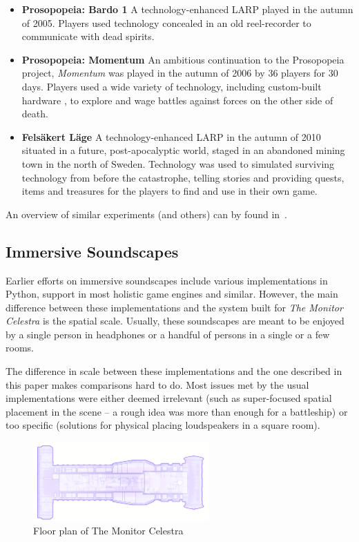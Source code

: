 \begin{itemize}
\item \textbf{Prosopopeia: Bardo 1} A technology-enhanced LARP played in the autumn of 2005. Players used technology concealed in an old reel-recorder to communicate with dead spirits.
\item \textbf{Prosopopeia: Momentum} An ambitious continuation to the Prosopopeia project, \emph{Momentum} was played in the autumn of 2006 by 36 players for 30 days.  Players used a wide variety of technology, including custom-built hardware , to explore and wage battles against forces on the other side of death. 
\item \textbf{Felsäkert Läge} A technology-enhanced LARP in the autumn of 2010 situated in a future, post-apocalyptic world, staged in an abandoned mining town in the north of Sweden. Technology was used to simulated surviving technology from before the catastrophe, telling stories and providing quests, items and treasures for the players to find and use in their own game.
\end{itemize}

An overview of similar experiments (and others) can by found in~\cite{nordiclarp}.

\subsection{Immersive Soundscapes}
Earlier efforts on immersive soundscapes include various implementations in Python, support in most holistic game engines and similar. However, the main difference between these implementations and the system built for \emph{The Monitor Celestra} is the spatial scale. Usually, these soundscapes are meant to be enjoyed by a single person in headphones or a handful of persons in a single or a few rooms. 

The difference in scale between these implementations and the one described in this paper makes comparisons hard to do. Most issues met by the usual implementations were either deemed irrelevant (such as super-focused spatial placement in the scene -- a rough idea was more than enough for a battleship) or too specific (solutions for physical placing loudspeakers in a square room). 

\begin{figure}[H]
  \centering
  \includegraphics[width=0.6\textwidth]{img/ship}
  \caption{Floor plan of The Monitor Celestra}
  \label{fig:celestra}
\end{figure}

